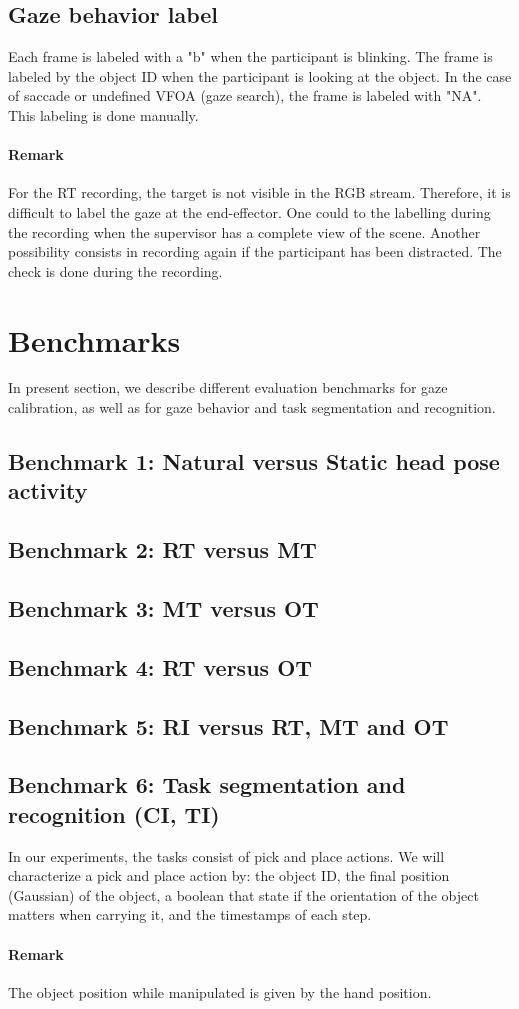 \documentclass[11pt,a4paper]{article}
\begin{document}
\subsection{Gaze behavior label}
Each frame is labeled with a "b" when the participant is blinking. The frame is labeled by the object ID when the participant is looking at the object. In the case of saccade or undefined VFOA (gaze search), the frame is labeled with "NA". This labeling is done manually. 
\paragraph{Remark}
For the RT recording, the target is not visible in the RGB stream. Therefore, it is difficult to label the gaze at the end-effector. One could to the labelling during the recording when the supervisor has a complete view of the scene. Another possibility consists in recording again if the participant has been distracted. The check is done during the recording.

\section{Benchmarks}
\label{Benchmarks}
In present section, we describe different evaluation benchmarks for gaze calibration, as well as for gaze behavior and task segmentation and recognition.
\subsection{Benchmark 1: Natural versus Static head pose activity}
\subsection{Benchmark 2: RT versus MT} 
\subsection{Benchmark 3: MT versus OT}
\subsection{Benchmark 4: RT versus OT}
\subsection{Benchmark 5: RI versus RT, MT and OT}
\subsection{Benchmark 6: Task segmentation and recognition (CI, TI)}
In our experiments, the tasks consist of pick and place actions. We will characterize a pick and place action by: the object ID, the final position (Gaussian) of the object, a boolean that state if the orientation of the object matters when carrying it, and the timestamps of each step.
\paragraph{Remark} The object position while manipulated is given by the hand position.

\clearpage


\end{document}
